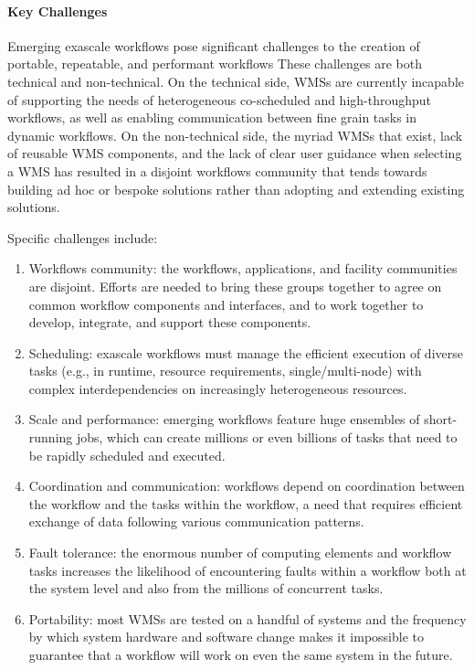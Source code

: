 \paragraph{Key Challenges}
Emerging exascale workflows pose significant challenges to the creation of
portable, repeatable, and performant workflows These challenges are both
technical and non-technical. On the technical side, WMSs are currently
incapable of supporting the needs of heterogeneous co-scheduled and
high-throughput workflows, as well as enabling communication between fine
grain tasks in dynamic workflows. On the non-technical side, the myriad WMSs
that exist, lack of reusable WMS components, and the lack of clear user
guidance when selecting a WMS has resulted in a disjoint workflows community
that tends towards building ad hoc or bespoke solutions rather than adopting
and extending existing solutions.

Specific challenges include: 
\begin{enumerate}
    \item Workflows community: the workflows, applications, and facility communities are disjoint. Efforts are needed to bring these groups together to agree on common workflow components and interfaces, and to work together to develop, integrate, and support these components.
    \item Scheduling: exascale workflows must manage the efficient execution of diverse
    tasks (e.g., in runtime, resource requirements, single/multi-node) with complex interdependencies on increasingly heterogeneous resources. 
    \item Scale and performance: emerging workflows feature huge ensembles of short-running jobs, which can create millions or even billions of tasks that need to be rapidly scheduled and executed.
    \item Coordination and communication: workflows depend on coordination between the workflow and the tasks within the workflow, a need that requires efficient exchange of data following various communication patterns.
    \item Fault tolerance: the enormous number of computing elements and workflow tasks increases the likelihood of encountering faults within a workflow both at the system level and also from the millions of concurrent tasks. 
    \item Portability: most WMSs are tested on a handful of systems and the frequency by which system hardware and software change makes it impossible to guarantee that a workflow will work on even the same system in the future.
\end{enumerate}

